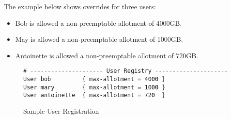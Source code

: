     The example below shows overrides for three users:
    \begin{itemize}
      \item Bob is allowed a non-preemptable allotment of 4000GB.
      \item May is allowed a non-preemptable allotment of 1000GB.
      \item Antoinette is allowed a non-preemptable allotment of 720GB.
    \end{itemize}    
        

    \begin{figure}[H]    
\begin{verbatim}
# --------------------- User Registry ---------------------
User bob         { max-allotment = 4000 }
User mary        { max-allotment = 1000 }
User antoinette  { max-allotment = 720  }
\end{verbatim}
          \caption{Sample User Registration}
      \label{fig:user.configuration}
    \end{figure}


